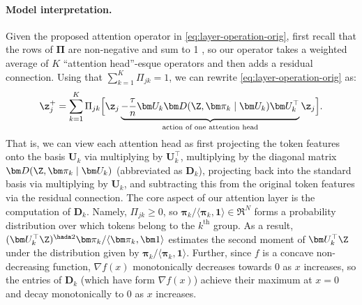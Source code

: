 \documentclass[../../book-main.tex]{subfiles}
\begin{document}
\paragraph{Model interpretation.} Given the proposed attention
operator in \eqref{eq:layer-operation-orig}, first recall that the
rows of $\bm\Pi$ are non-negative and sum to 1
, so our operator takes a weighted average of $K$ ``attention
head''-esque operators and then adds a residual connection. Using
that \(\sum_{k = 1}^{K}\Pi_{jk} = 1\), we can rewrite
\eqref{eq:layer-operation-orig} as: %
\begin{equation}
    \label{eq:z_up}
    \z_j^+ = \sum_{k=1}^K \Pi_{jk} \Big[ \z_j \underbrace{-
            \frac{\tau}{n} \bm U_{k} \bm D(\Z, \bm \pi_{k} \mid \bm U_{k})
    \bm U_{k}^{\top}}_{\text{action of one attention head}} \z_j \Big].
\end{equation}
That is, we can view each attention head as first projecting the token features
onto the basis $\bm U_{k}$ via multiplying by $\bm U_k^\top$, multiplying by the
diagonal matrix $\bm D(\Z, \bm \pi_{k} \mid \bm U_{k})$ (abbreviated as \(\bm
D_{k}\)), projecting back into the standard basis via multiplying by $\bm
U_{k}$, and subtracting this from the original token features via the residual
connection. The core aspect of our attention layer is the computation of $\bm
D_{k}$.  Namely, \(\Pi_{jk} \geq 0\), so $\bm \pi_k / \langle \bm \pi_{k}, \bm
1\rangle \in \Re^N$ forms a probability distribution over which tokens belong to
the $k^\text{th}$ group.  As a result, $(\bm U^\top_k \Z)^{\hada 2}
\bm \pi_k / \langle \bm \pi_{k}, \bm 1\rangle$ estimates the second
moment of $\bm U_k^\top \Z$ under the distribution given by $\bm
\pi_k /  \langle \bm \pi_{k}, \bm 1\rangle$.  Further, since $f$ is a
concave non-decreasing function, $\nabla f(x)$ monotonically
decreases towards $0$ as $x$ increases, so the entries of $\bm D_{k}$
(which have form $\nabla f(x)$) achieve their maximum at $x=0$ %
and decay monotonically to $0$ as $x$ increases.
\end{document}

